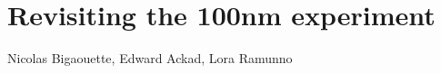
\newcommand{\PaperTitleHundrednm}{Revisiting the 100nm experiment}

\section{\PaperTitleHundrednm}

\begin{flushright}
Nicolas Bigaouette, Edward Ackad, Lora Ramunno
\end{flushright}


% 
